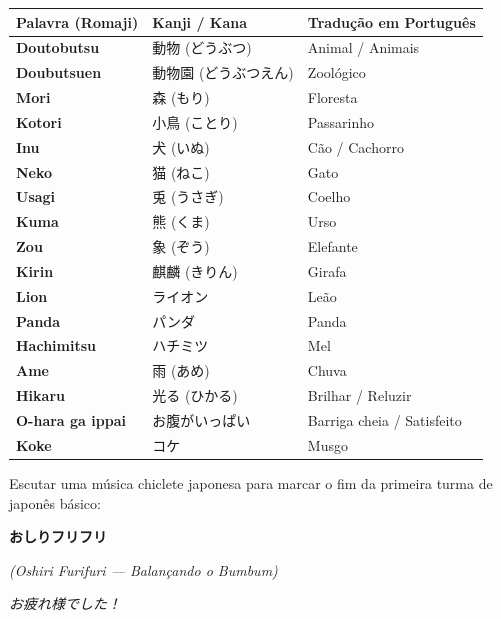 \documentclass[a4paper,12pt]{article}
\begin{document}
\noindent
\small
\begin{tabularx}{\textwidth}{>{\bfseries\color{jppurple}}l X X}
\toprule
Palavra (Romaji) & Kanji / Kana & Tradução em Português \\
\midrule
Doutobutsu & 動物 (どうぶつ) & Animal / Animais \\
Doubutsuen & 動物園 (どうぶつえん) & Zoológico \\
Mori & 森 (もり) & Floresta \\
Kotori & 小鳥 (ことり) & Passarinho \\
Inu & 犬 (いぬ) & Cão / Cachorro \\
Neko & 猫 (ねこ) & Gato \\
Usagi & 兎 (うさぎ) & Coelho \\
Kuma & 熊 (くま) & Urso \\
Zou & 象 (ぞう) & Elefante \\
Kirin & 麒麟 (きりん) & Girafa \\
Lion & ライオン & Leão \\
Panda & パンダ & Panda \\
Hachimitsu & ハチミツ & Mel \\
Ame & 雨 (あめ) & Chuva \\
Hikaru & 光る (ひかる) & Brilhar / Reluzir \\
O-hara ga ippai & お腹がいっぱい & Barriga cheia / Satisfeito \\
Koke & コケ & Musgo \\
\bottomrule
\end{tabularx}

\vspace{0.5cm}

\begin{tcolorbox}[colback=jppurple!6, colframe=jppurple, title=\textbf{Dinâmica em Grupo}, fonttitle=\bfseries]
\small
Escutar uma música chiclete japonesa para marcar o fim da primeira turma de japonês básico:

\vspace{0.2cm}

{\centering \Large\bfseries おしりフリフリ\par}
{\centering \small\textit{(Oshiri Furifuri --- Balançando o Bumbum)}\par}
\end{tcolorbox}

\vspace{0.4cm}

\begin{center}
    \small\color{gray} \textit{お疲れ様でした！}
\end{center}
\end{document}
